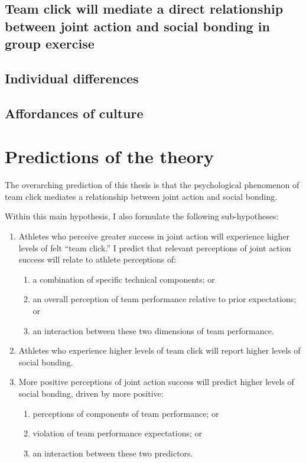 \begin{CJK}{UTF8}{gbsn}
\subsection{Team click will mediate a direct relationship between joint action and social bonding in group exercise}




\subsection{Individual differences}




\subsection{Affordances of culture}






\section{Predictions of the theory}


    The overarching prediction of this thesis is that the psychological phenomenon of team click mediates a relationship between joint action and social bonding.

    Within this main hypothesis, I also formulate the following sub-hypotheses:
    \begin{enumerate}
      \item Athletes who perceive greater success in joint action will experience higher levels of felt ``team click.'' I predict that relevant perceptions of joint action success will relate to athlete perceptions of:
        \begin{enumerate}
          \item a combination of specific technical components; or
          \item an overall perception of team performance relative to prior expectations; or
          \item an interaction between these two dimensions of team performance.
        \end{enumerate}
      \item Athletes who experience higher levels of team click will report higher levels of social bonding.
      \item More positive perceptions of joint action success will predict higher levels of social bonding, driven by more positive:
      \begin{enumerate}
        \item perceptions of components of team performance; or
        \item violation of team performance expectations; or
        \item an interaction between these two predictors.
      \end{enumerate}
    \end{enumerate}


\end{CJK}
